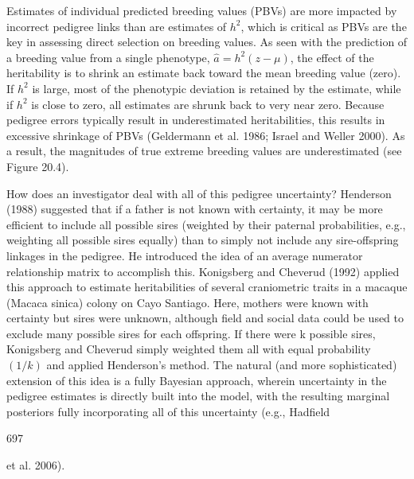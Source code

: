 \documentclass{article}
\begin{document}
Estimates of individual predicted breeding values (PBVs) are more impacted by incorrect pedigree links than are estimates of  $ h^2 $, which is critical as PBVs are the key in assessing direct selection on breeding values. As seen with the prediction of a breeding value from a single phenotype,  $ \hat{a} = h^2(z - \mu) $, the effect of the heritability is to shrink an estimate back toward the mean breeding value (zero). If  $ h^2 $ is large, most of the phenotypic deviation is retained by the estimate, while if  $ h^2 $ is close to zero, all estimates are shrunk back to very near zero. Because pedigree errors typically result in underestimated heritabilities, this results in excessive shrinkage of PBVs (Geldermann et al. 1986; Israel and Weller 2000). As a result, the magnitudes of true extreme breeding values are underestimated (see Figure 20.4).

How does an investigator deal with all of this pedigree uncertainty? Henderson (1988) suggested that if a father is not known with certainty, it may be more efficient to include all possible sires (weighted by their paternal probabilities, e.g., weighting all possible sires equally) than to simply not include any sire-offspring linkages in the pedigree. He introduced the idea of an average numerator relationship matrix to accomplish this. Konigsberg and Cheverud (1992) applied this approach to estimate heritabilities of several craniometric traits in a macaque (Macaca sinica) colony on Cayo Santiago. Here, mothers were known with certainty but sires were unknown, although field and social data could be used to exclude many possible sires for each offspring. If there were k possible sires, Konigsberg and Cheverud simply weighted them all with equal probability  $ (1/k) $ and applied Henderson's method. The natural (and more sophisticated) extension of this idea is a fully Bayesian approach, wherein uncertainty in the pedigree estimates is directly built into the model, with the resulting marginal posteriors fully incorporating all of this uncertainty (e.g., Hadfield

697

et al. 2006).
\end{document}
